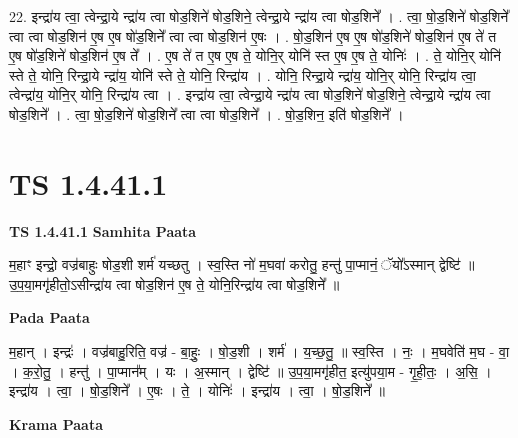 \documentclass[17pt]{extarticle}
\begin{document}
22. इन्द्रा॑य त्वा॒ त्वेन्द्रा॒ये न्द्रा॑य त्वा षोड॒शिने॑ षोड॒शिने॒ त्वेन्द्रा॒ये न्द्रा॑य त्वा षोड॒शिने᳚ । . त्वा॒ षो॒ड॒शिने॑ षोड॒शिने᳚ त्वा त्वा षोड॒शिन॑ ए॒ष ए॒ष षो॑ड॒शिने᳚ त्वा त्वा षोड॒शिन॑ ए॒षः । . षो॒ड॒शिन॑ ए॒ष ए॒ष षो॑ड॒शिने॑ षोड॒शिन॑ ए॒ष ते॑ त ए॒ष षो॑ड॒शिने॑ षोड॒शिन॑ ए॒ष ते᳚ । . ए॒ष ते॑ त ए॒ष ए॒ष ते॒ योनि॒र् योनि॑ स्त ए॒ष ए॒ष ते॒ योनिः॑ । . ते॒ योनि॒र् योनि॑ स्ते ते॒ योनि॒ रिन्द्रा॒ये न्द्रा॑य॒ योनि॑ स्ते ते॒ योनि॒ रिन्द्रा॑य । . योनि॒ रिन्द्रा॒ये न्द्रा॑य॒ योनि॒र् योनि॒ रिन्द्रा॑य त्वा॒ त्वेन्द्रा॑य॒ योनि॒र् योनि॒ रिन्द्रा॑य त्वा । . इन्द्रा॑य त्वा॒ त्वेन्द्रा॒ये न्द्रा॑य त्वा षोड॒शिने॑ षोड॒शिने॒ त्वेन्द्रा॒ये न्द्रा॑य त्वा षोड॒शिने᳚ । . त्वा॒ षो॒ड॒शिने॑ षोड॒शिने᳚ त्वा त्वा षोड॒शिने᳚ । . षो॒ड॒शिन॒ इति॑ षोड॒शिने᳚ । \newline
\pagebreak
{}
\section*{ TS 1.4.41.1 }

\textbf{TS 1.4.41.1 } \newline
\textbf{Samhita Paata} \newline

म॒हाꣳ इन्द्रो॒ वज्र॑बाहुः षोड॒शी शर्म॑ यच्छतु । स्व॒स्ति नो॑ म॒घवा॑ करोतु॒ हन्तु॑ पा॒प्मानं॒ ॅयो᳚ऽस्मान् द्वेष्टि॑ ॥ उ॒प॒या॒मगृ॑हीतो॒ऽसीन्द्रा॑य त्वा षोड॒शिन॑ ए॒ष ते॒ योनि॒रिन्द्रा॑य त्वा षोड॒शिने᳚ ॥ \newline

\textbf{Pada Paata} \newline

म॒हान् । इन्द्रः॑ । वज्र॑बाहु॒रिति॒ वज्र॑ - बा॒हुः॒ । षो॒ड॒शी । शर्म॑ । य॒च्छ॒तु॒ ॥ स्व॒स्ति । नः॒ । म॒घवेति॑ म॒घ - वा॒ । क॒रो॒तु॒ । हन्तु॑ । पा॒प्मान᳚म् । यः । अ॒स्मान् । द्वेष्टि॑ ॥ उ॒प॒या॒मगृ॑हीत॒ इत्यु॑पया॒म - गृ॒ही॒तः॒ । अ॒सि॒ । इन्द्रा॑य । त्वा॒ । षो॒ड॒शिने᳚ । ए॒षः । ते॒ । योनिः॑ । इन्द्रा॑य । त्वा॒ । षो॒ड॒शिने᳚ ॥  \newline


\textbf{Krama Paata} \newline
\end{document}
